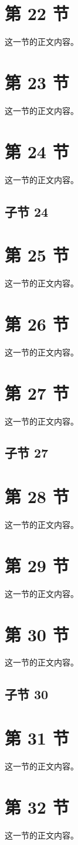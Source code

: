 \documentclass{article}
\begin{document}
\section{第 22 节}
这一节的正文内容。
\section{第 23 节}
这一节的正文内容。
\section{第 24 节}
这一节的正文内容。
\subsection{子节 24}
\section{第 25 节}
这一节的正文内容。
\section{第 26 节}
这一节的正文内容。
\section{第 27 节}
这一节的正文内容。
\subsection{子节 27}
\section{第 28 节}
这一节的正文内容。
\section{第 29 节}
这一节的正文内容。
\section{第 30 节}
这一节的正文内容。
\subsection{子节 30}
\section{第 31 节}
这一节的正文内容。
\section{第 32 节}
这一节的正文内容。
\end{document}
